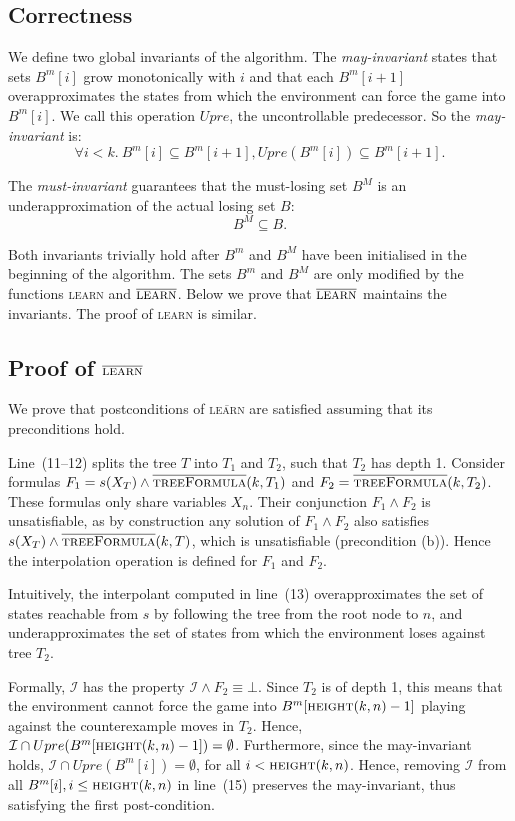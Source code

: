 \documentclass{llncs}
\newcommand{\II}{\mathcal{I}}
\newcommand{\textoverline}[1]{$\overline{\mbox{#1}}$}
\begin{document}
\subsection{Correctness}


We define two global invariants of the algorithm.  The \emph{may-invariant}
states that sets $B^m[i]$ grow monotonically with $i$ and that each $B^m[i+1]$
overapproximates the states from which the environment can force the game into
$B^m[i]$. We call this operation $Upre$, the uncontrollable predecessor. So the
\emph{may-invariant} is: $$\forall i<k.~B^m[i] \subseteq B^m[i+1], Upre(B^m[i])
\subseteq B^m[i+1].$$

The \emph{must-invariant} guarantees that the must-losing set $B^M$ is an
underapproximation of the actual losing set $B$: $$B^M \subseteq B.$$

Both invariants trivially hold after $B^m$ and $B^M$ have been initialised in the
beginning of the algorithm.
The sets $B^m$ and $B^M$ are only modified by the functions \textsc{learn} and
\textoverline{\textsc{learn}}.  Below we prove that \textoverline{\textsc{learn}} 
maintains the invariants.  The proof of \textsc{learn} is similar.

\subsection{Proof of \textoverline{\textsc{learn}}}

We prove that postconditions of \textsc{\textoverline{learn}} are satisfied
assuming that its preconditions hold.

Line~(11--12) splits the tree $T$ into $T_1$ and $T_2$, such that $T_2$ has depth
1.  Consider formulas $F_1=s(X_T) \land
\textsc{\textoverline{treeFormula}}(k, T_1)$ and $F_2 =
\textsc{\textoverline{treeFormula}}(k, T_2)$.  These formulas only share variables
$X_n$.  Their conjunction $F_1 \land F_2$ is unsatisfiable, as by construction
any solution of $F_1 \land F_2$ also satisfies $s(X_T) \land
\textsc{\textoverline{treeFormula}}(k, T)$, which is unsatisfiable (precondition (b)).  Hence the
interpolation operation is defined for $F_1$ and $F_2$.  

Intuitively, the interpolant computed in line~(13) overapproximates the set of
states reachable from $s$ by following the tree from the root node to $n$,
and underapproximates the set of states from which the environment loses
against tree $T_2$.  

Formally, $\II$ has the property $\II \land F_2 \equiv \bot$.  Since $T_2$ is
of depth 1, this means that the environment cannot force the game into
$B^m[\textsc{height}(k, n)-1]$ playing against the counterexample moves in $T_2$.
Hence, $\II \cap Upre(B^m[\textsc{height}(k, n)-1]) = \emptyset$.  Furthermore,
since the may-invariant holds, $\II \cap Upre(B^m[i]) =
\emptyset$, for all $i < \textsc{height}(k, n)$.  Hence, removing $\II$ from all
$B^m[i], i\leq \textsc{height}(k, n)$ in line~(15) preserves the may-invariant,
thus satisfying the first post-condition.
\end{document}
